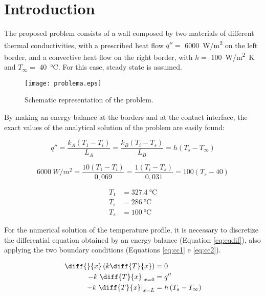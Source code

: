\section{Introduction}

The proposed problem consists of a wall composed by two materials of different thermal conductivities, with a prescribed heat flow $q'' =$ \SI{6000}{W/m^2} on the left border, and a convective heat flow on the right border, with $h =$ \SI{100}{W/m^2.K} and $T_\infty =$ \SI{40}{\celsius}.
For this case, steady state is assumed.

\begin{figure}[h]
    \centering
    \texttt{[image: problema.eps]}
    \caption{Schematic representation of the problem.}
    \label{fig:problema}
\end{figure}

By making an energy balance at the borders and at the contact interface, the exact values of the analytical solution of the problem are easily found:

\begin{equation*}
    q'' = \frac{k_A \left(T_1 - T_i \right)}{L_A} = \frac{k_B \left(T_i - T_s \right)}{L_B} = h \left(T_s - T_\infty \right)
\end{equation*}

\begin{equation*}
    \SI{6000}{W/m^2} =
    \frac{10 \left(T_1 - T_i \right)}{0,069} =
    \frac{1  \left(T_i - T_s \right)}{0,031} =
    100 \left(T_s - 40 \right)
\end{equation*}

\begin{align*}
    T_1 &= \SI{327.4}{\celsius} \\
    T_i &= \SI{286}{\celsius} \\
    T_s &= \SI{100}{\celsius}
\end{align*}

For the numerical solution of the temperature profile, it is necessary to discretize the differential equation obtained by an energy balance (Equation \ref{eq:eqdif}), also applying the two boundary conditions (Equations \ref{eq:cc1} e \ref{eq:cc2}).

\begin{align} 
    \diff{}{x} \left( k \diff{T}{x} \right) &= 0 \label{eq:eqdif} \\
    -k \left. \diff{T}{x} \right|_{x = 0} &= q'' \label{eq:cc1} \\
    -k \left. \diff{T}{x}\right|_{x = L} &= h \left(T_s - T_\infty \right) \label{eq:cc2}
\end{align}

